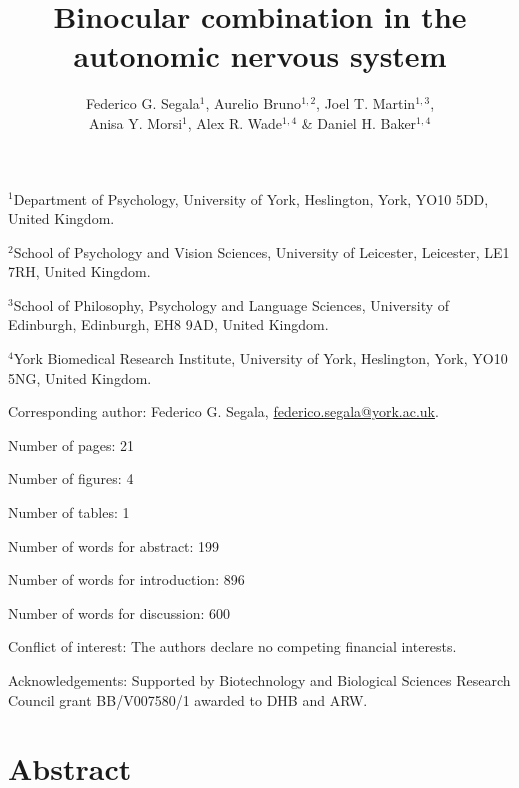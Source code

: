\documentclass[
]{article}
\title{Binocular combination in the autonomic nervous system}
\author{Federico G. Segala\(^1\), Aurelio Bruno\(^{1,2}\), Joel T. Martin\(^{1,3}\),\\
Anisa Y. Morsi\(^1\), Alex R. Wade\(^{1,4}\) \& Daniel H. Baker\(^{1,4}\)}
\date{}
\begin{document}
\maketitle

\(^1\)Department of Psychology, University of York, Heslington, York, YO10 5DD, United Kingdom.

\(^2\)School of Psychology and Vision Sciences, University of Leicester, Leicester, LE1 7RH, United Kingdom.

\(^3\)School of Philosophy, Psychology and Language Sciences, University of Edinburgh, Edinburgh, EH8 9AD, United Kingdom.

\(^4\)York Biomedical Research Institute, University of York, Heslington, York, YO10 5NG, United Kingdom.

Corresponding author: Federico G. Segala, \url{federico.segala@york.ac.uk}.

Number of pages: 21

Number of figures: 4

Number of tables: 1

Number of words for abstract: 199

Number of words for introduction: 896

Number of words for discussion: 600

Conflict of interest: The authors declare no competing financial interests.

Acknowledgements: Supported by Biotechnology and Biological Sciences Research Council grant BB/V007580/1 awarded to DHB and ARW.

\pagebreak

\hypertarget{abstract}{%
\section{Abstract}\label{abstract}}
\end{document}
